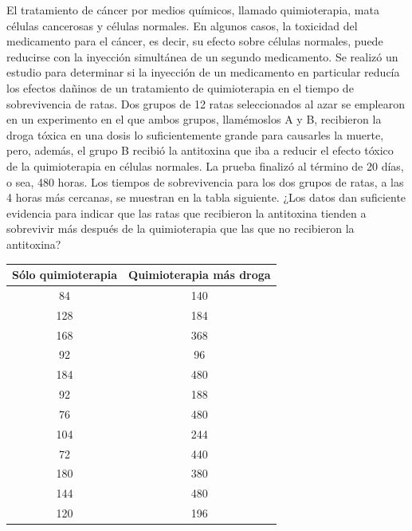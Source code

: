 \documentclass{article}
\begin{document}
El tratamiento de cáncer por medios químicos, llamado quimioterapia, mata células cancerosas y células normales. En algunos casos, la toxicidad del medicamento para el cáncer, es decir, su efecto sobre células normales, puede reducirse con la inyección simultánea de un segundo medicamento. Se realizó un estudio para determinar si la inyección de un medicamento en particular reducía los efectos dañinos de un tratamiento de quimioterapia en el tiempo de sobrevivencia de ratas. Dos grupos de 12 ratas seleccionados al azar se emplearon en un experimento en el que ambos grupos, llamémoslos A y B, recibieron la droga tóxica en una dosis lo suficientemente grande para causarles la muerte, pero, además, el grupo B recibió la antitoxina que iba a reducir el efecto tóxico de la quimioterapia en células normales. La prueba finalizó al término de 20 días, o sea, 480 horas. Los tiempos de sobrevivencia para los dos grupos de ratas, a las 4 horas más cercanas, se muestran en la tabla siguiente. ¿Los datos dan suficiente evidencia para indicar que las ratas que recibieron la antitoxina tienden a sobrevivir más después de la quimioterapia que las que no recibieron la antitoxina?

\begin{center}
    \begin{tabular}{c c}
        Sólo quimioterapia & Quimioterapia más droga \\
        \hline
        84                 & 140                     \\
        128                & 184                     \\
        168                & 368                     \\
        92                 & 96                      \\
        184                & 480                     \\
        92                 & 188                     \\
        76                 & 480                     \\
        104                & 244                     \\
        72                 & 440                     \\
        180                & 380                     \\
        144                & 480                     \\
        120                & 196                     \\
    \end{tabular}
\end{center}
\end{document}
